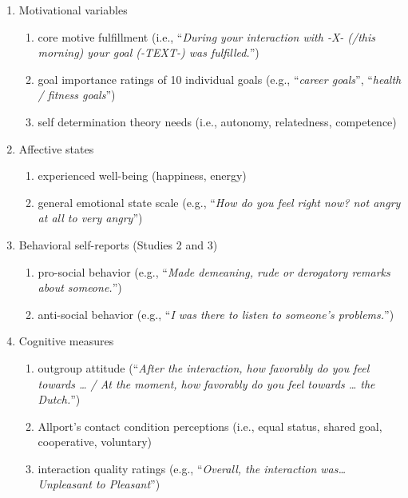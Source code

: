 \documentclass[]{article}
\providecommand{\tightlist}{%
\setlength{\itemsep}{0pt}\setlength{\parskip}{0pt}}
\begin{document}
\begin{enumerate}
\def\labelenumi{\arabic{enumi}.}
\tightlist
\item
  Motivational variables

  \begin{enumerate}
  \def\labelenumii{\alph{enumii}.}
  \tightlist
  \item
    core motive fulfillment (i.e., ``\emph{During your interaction with
    -X- (/this morning) your goal (-TEXT-) was fulfilled.}'')
  \item
    goal importance ratings of 10 individual goals (e.g., ``\emph{career
    goals}'', ``\emph{health / fitness goals}'')
  \item
    self determination theory needs (i.e., autonomy, relatedness,
    competence)
  \end{enumerate}
\item
  Affective states

  \begin{enumerate}
  \def\labelenumii{\alph{enumii}.}
  \tightlist
  \item
    experienced well-being (happiness, energy)
  \item
    general emotional state scale (e.g., ``\emph{How do you feel right
    now? not angry at all to very angry}'')
  \end{enumerate}
\item
  Behavioral self-reports (Studies 2 and 3)

  \begin{enumerate}
  \def\labelenumii{\alph{enumii}.}
  \tightlist
  \item
    pro-social behavior (e.g., ``\emph{Made demeaning, rude or
    derogatory remarks about someone.}'')
  \item
    anti-social behavior (e.g., ``\emph{I was there to listen to
    someone's problems.}'')
  \end{enumerate}
\item
  Cognitive measures

  \begin{enumerate}
  \def\labelenumii{\alph{enumii}.}
  \tightlist
  \item
    outgroup attitude (``\emph{After the interaction, how favorably do
    you feel towards \ldots{} / At the moment, how favorably do you feel
    towards \ldots{} the Dutch.}'')
  \item
    Allport's contact condition perceptions (i.e., equal status, shared
    goal, cooperative, voluntary)
  \item
    interaction quality ratings (e.g., ``\emph{Overall, the interaction
    was\ldots{} Unpleasant to Pleasant}'')
  \end{enumerate}
\end{enumerate}
\end{document}
